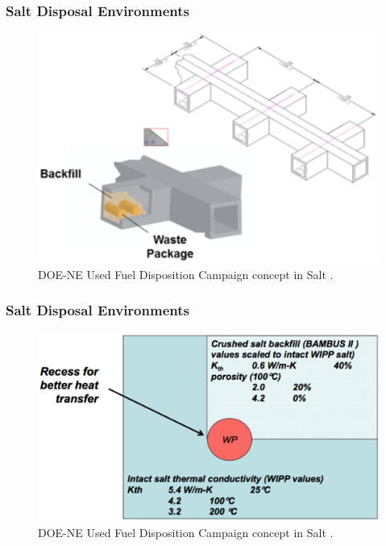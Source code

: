 \begin{frame}[ctb!]
  \frametitle{Salt Disposal Environments}
  \footnotesize{

  \begin{figure}[h!]
    \begin{center}
      \includegraphics[height=.7\textheight]{./images/carter_salt_layout.eps}
    \end{center}
    \caption{DOE-NE Used Fuel Disposition Campaign  concept in 
    Salt \cite{hardin_generic_2011}.}
    \label{fig:salt_layout}
  \end{figure}
}
\end{frame}
\begin{frame}[ctb!]
  \frametitle{Salt Disposal Environments}
  \footnotesize{

  \begin{figure}[h!]
    \begin{center}
      \includegraphics[height=.7\textheight]{./images/hardin_salt_layout.eps}
    \end{center}
    \caption{DOE-NE Used Fuel Disposition Campaign  concept in 
    Salt \cite{hardin_generic_2011}.}
    \label{fig:hardin_salt_layout}
  \end{figure}
}
\end{frame}


